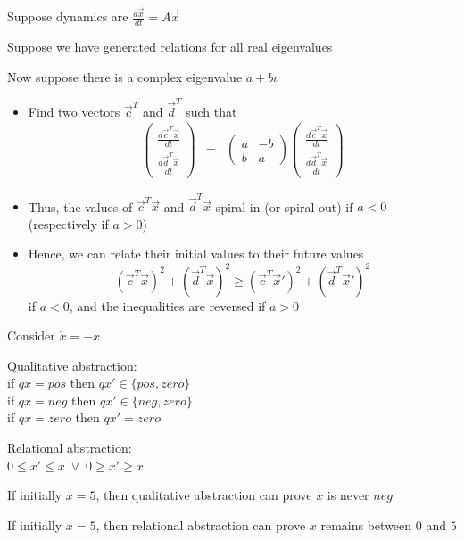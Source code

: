 \documentclass{seminar}
\begin{document}
\begin{slide}

Suppose dynamics are $\frac{d\vec{x}}{dt} = A\vec{x}$

Suppose we have generated relations for all real eigenvalues

Now suppose there is a complex eigenvalue $a + b\iota$

\begin{itemize}
\item Find two vectors $\vec{c}^T$ and $\vec{d}^T$ such that
\begin{eqnarray*}
 \left(\begin{array}{c}
 \frac{d\vec{c}^T\vec{x}}{dt} \\
 \frac{d\vec{d}^T\vec{x}}{dt} 
 \end{array}\right)
 & = & 
  \left(\begin{array}{cc}
   a & -b \\ b & a
  \end{array}\right)
 \left(\begin{array}{c}
 \frac{d\vec{c}^T\vec{x}}{dt} \\
 \frac{d\vec{d}^T\vec{x}}{dt} 
 \end{array}\right)
\end{eqnarray*}

\item
 Thus,
 the values of $\vec{c}^T\vec{x}$ and $\vec{d}^T\vec{x}$ 
 spiral in (or spiral out) if $a < 0$ (respectively if $a > 0$) 

\item
 Hence, we can relate their initial values to their future values
$$
 (\vec{c}^T \vec{x})^2 + 
 (\vec{d}^T \vec{x})^2 
 \geq
 ({\vec{c}}^{T} \vec{x}')^2 + 
 ({\vec{d}}^{T} \vec{x}')^2 
$$
if $a < 0$, and the inequalities are reversed if $a > 0$
 
\end{itemize}

\end{slide}
\begin{slide}

Consider $\dot{x} = -x$

Qualitative abstraction:
\\
if $qx = pos$ then $qx' \in \{pos,zero\}$
\\
if $qx = neg$ then $qx' \in \{neg,zero\}$
\\
if $qx = zero$ then $qx' = zero$

\bigskip
Relational abstraction:
\\
$0 \leq x' \leq x \;\vee\; 0 \geq x' \geq x$

\bigskip
If initially $x = 5$, then qualitative abstraction
can prove $x$ is never $neg$

\bigskip
If initially $x = 5$, then relational abstraction
can prove $x$ remains between $0$ and $5$
\end{slide}
\end{document}
